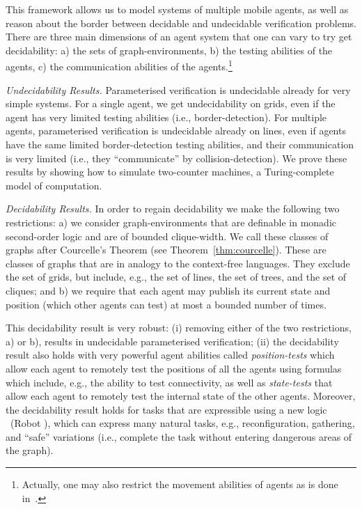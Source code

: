 This framework allows us to model systems of multiple mobile agents, as well as reason about the border between decidable and undecidable verification problems. There are three main dimensions of an agent system that one can vary to try get decidability: a) the sets of graph-environments, b) the testing abilities of the agents, c) the communication abilities of the agents.\footnote{Actually, one may also restrict the movement abilities of agents as is done in~\cite{AAMAS16Grids}.}


\emph{Undecidability Results.}
Parameterised verification is undecidable already for very simple systems. For a single agent, we get undecidability on grids, even if the agent has very limited testing abilities (i.e., border-detection). For multiple agents, parameterised verification is undecidable already on lines, even if agents have the same limited border-detection testing abilities, and their communication is very limited (i.e., they ``communicate'' by collision-detection). We prove these results by showing how to simulate two-counter machines, a Turing-complete model of computation.

\emph{Decidability Results.}
In order to regain decidability we make the following two restrictions: a) we consider graph-environments that are definable in monadic second-order logic and are of bounded clique-width. We call these \emph{\courcellian} classes of graphs after Courcelle's Theorem (see Theorem~\ref{thm:courcelle}). These are classes of graphs that are in analogy to the context-free languages. They exclude the set of grids, but include, e.g., the set of lines, the set of trees, and the set of cliques; and b) we require that each agent 
may publish its current state and position (which other agents can test) at most a bounded number of times. 

This decidability result is very robust: (i) removing either of the two restrictions, a) or b), results in undecidable parameterised verification; (ii) the decidability result also holds with very powerful agent abilities called {\em position-tests} which allow each agent to {remotely} test the positions of all the agents using formulas which include, e.g., the ability to test connectivity, as well as {\em state-tests} that allow each agent to {remotely} test the internal state of the other agents. Moreover, the decidability result holds for tasks that are expressible using a new logic \RLTL\ (Robot \LTL), which can express many natural tasks, e.g., reconfiguration, gathering, and ``safe'' variations (i.e., complete the task without entering dangerous areas of the graph).%

